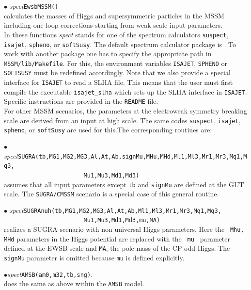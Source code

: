 \documentclass[12pt,a4paper]{article}
\begin{document}
{\noindent $\bullet$ {\it spect}\verb|EwsbMSSM()|\\
 calculates the  masses of Higgs  and
supersymmetric particles in the MSSM including one-loop
corrections starting from weak scale input parameters. \\
In these functions {\it spect} stands for one of
the spectrum calculators {\tt suspect}, {\tt isajet},
{\tt spheno}, or {\tt softSusy}.
The  default spectrum calculator package is {\suspect}. To work
with another package one has to specify the appropriate path in
\verb|MSSM/lib/Makefile|. For this,  the environment variables
\verb|ISAJET|, \verb|SPHENO| or \verb|SOFTSUSY| must be redefined
accordingly. Note that we also provide a special interface for
\verb|ISAJET| to read a SLHA file. This means that the user must
first compile the executable \verb|isajet_slha| which sets up the  SLHA 
interface in  {\tt ISAJET}. Specific instructions are provided in the \verb|README| file.\\
 

For other MSSM scenarios, the   parameters at the electroweak symmetry breaking scale are derived from 
an  input at high scale. The same codes {\tt suspect}, {\tt isajet},
{\tt spheno}, or {\tt softSusy} are used for this.The corresponding
routines are:

\noindent $\bullet$ {\it
spect}\verb|SUGRA(tb,MG1,MG2,MG3,Al,At,Ab,signMu,MHu,MHd,Ml1,Ml3,Mr1,Mr3,Mq1,Mq3,|\\
\verb|                       Mu1,Mu3,Md1,Md3)|\\
assumes that  all input parameters except {\tt tb} and {\tt signMu}  are
defined at the GUT scale. The {\tt SUGRA/CMSSM} scenario is a special case of this general routine. 

\noindent $\bullet$ {\it
spect}\verb|SUGRAnuh(tb,MG1,MG2,MG3,Al,At,Ab,Ml1,Ml3,Mr1,Mr3,Mq1,Mq3,|\\
\verb|                       Mu1,Mu3,Md1,Md3,mu,MA)|\\
realizes a SUGRA scenario with non universal Higgs parameters. Here the {\tt
Mhu, MHd} parameters in the Higgs potential are replaced with the {\tt
mu } parameter defined at the  EWSB scale and {\tt MA}, the pole mass of the CP-odd Higgs. The
{\tt signMu} parameter is omitted  because {\tt mu} is defined
explicitly.

\noindent
$\bullet${\it spect}\verb|AMSB(am0,m32,tb,sng)|.\\
does  the same as above within the {\tt AMSB} model.\\


}
\end{document}
